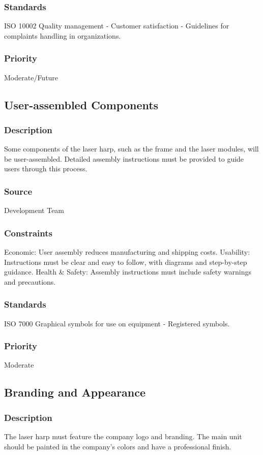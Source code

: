 \subsubsection{Standards}
ISO 10002 Quality management - Customer satisfaction - Guidelines for complaints handling in organizations.
\subsubsection{Priority}
Moderate/Future


\subsection{User-assembled Components}
\subsubsection{Description}
Some components of the laser harp, such as the frame and the laser modules, will be user-assembled. Detailed assembly instructions must be provided to guide users through this process.
\subsubsection{Source}
Development Team
\subsubsection{Constraints}
Economic: User assembly reduces manufacturing and shipping costs.
Usability: Instructions must be clear and easy to follow, with diagrams and step-by-step guidance.
Health & Safety: Assembly instructions must include safety warnings and precautions.
\subsubsection{Standards}
ISO 7000 Graphical symbols for use on equipment - Registered symbols.
\subsubsection{Priority}
Moderate


\subsection{Branding and Appearance}
\subsubsection{Description}
The laser harp must feature the company logo and branding. The main unit should be painted in the company’s colors and have a professional finish.
